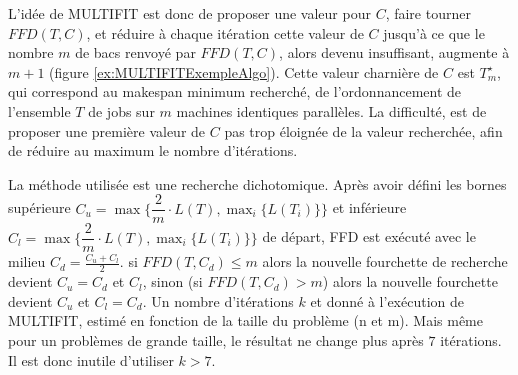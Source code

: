 \documentclass[a4paper,12pt]{report}
\theoremstyle{plain}				%
\theoremstyle{definition}				%
\newcommand{\tdi}[1]{\todo[inline]{{#1}}{}}
\newcommand{\lp}[1]{\todo[author=LP,color=yellow,inline]{#1}}
\begin{document}
L'idée de MULTIFIT est donc de proposer une valeur pour $C$, faire
tourner $FFD(T,C) $, et réduire à chaque itération cette valeur de $C$
jusqu'à ce que le nombre $m$ de bacs renvoyé par $FFD(T,C) $, alors
devenu insuffisant, augmente à $m+1$ (figure \ref{ex:MULTIFITExempleAlgo}).
Cette valeur charnière de $C$ est $T_m^\star$, qui correspond au
makespan minimum recherché, de l'ordonnancement de l'ensemble $T$ de
jobs sur $m$ machines identiques parallèles.
La difficulté, est de proposer une première valeur de $C$ pas trop
éloignée de la valeur recherchée, afin de réduire au maximum le nombre
d'itérations.

La méthode utilisée est une recherche dichotomique.
Après avoir défini les bornes supérieure
$C_u = \max\{\dfrac{2}{m} \cdot L(T), \max_i\{L(T_i)\} \}$ et
inférieure $C_l = \max\{\dfrac{2}{m} \cdot L(T), \max_i\{L(T_i)\} \}$
de départ, FFD est exécuté avec le milieu $C_d = \frac{C_u + C_l}{2}$.
si $FFD(T,C_d)\le m$ alors la nouvelle fourchette de recherche devient
$C_u = C_d$ et $C_l$, sinon (si $FFD(T,C_d)> m$) alors la nouvelle
fourchette devient $C_u$ et $C_l = C_d$.
Un nombre d'itérations $k$ et donné à l'exécution de MULTIFIT, estimé
en fonction de la taille du problème (n et m).
Mais même pour un problèmes de grande taille, le résultat ne change
plus après $7$ itérations.
Il est donc inutile d'utiliser $k>7$.

\begin{figure}
\end{figure}
\end{document}
